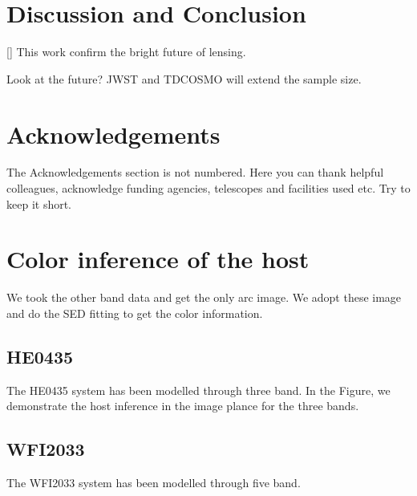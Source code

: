\documentclass[fleqn,usenatbib]{mnras}
\begin{document}
\section{Discussion and Conclusion}
[] This work confirm the bright future of lensing.

Look at the future? JWST and TDCOSMO will extend the sample size.


\section*{Acknowledgements}

The Acknowledgements section is not numbered. Here you can thank helpful
colleagues, acknowledge funding agencies, telescopes and facilities used etc.
Try to keep it short.










\appendix

\section{Color inference of the host}
We took the other band data and get the only arc image. We adopt these image and do the SED fitting to get the color information.
\subsection{HE0435}
The HE0435 system has been modelled through three band. In the Figure, we demonstrate the host inference in the image plance for the three bands. 

\subsection{WFI2033}
The WFI2033 system has been modelled through five band.



\bsp	%
\label{lastpage}
\end{document}
